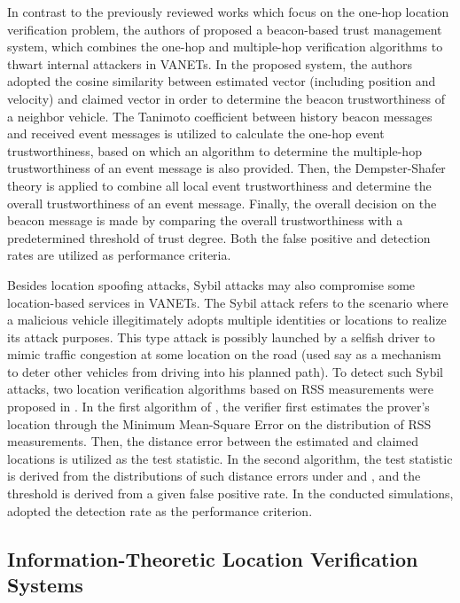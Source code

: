 \documentclass[journal]{IEEEtran}
\begin{document}
 In contrast to the previously reviewed works which focus on the one-hop location verification problem, the authors of \cite{chen2013beacon} proposed a beacon-based trust management system, which combines the one-hop and multiple-hop verification algorithms to thwart internal attackers in VANETs. In the proposed system, the authors adopted the cosine similarity \cite{yan2008providing} between estimated vector (including position and velocity) and claimed vector in order to determine the beacon trustworthiness of a neighbor vehicle. The Tanimoto  coefficient between history beacon messages and received event messages is utilized to calculate the one-hop event trustworthiness, based on which an algorithm to determine the multiple-hop trustworthiness of an event message is also provided. Then, the Dempster-Shafer theory \cite{chen2005dempster} is applied to combine all local event trustworthiness and determine the overall trustworthiness of an event message. Finally, the overall decision on the beacon message is made by comparing the overall trustworthiness with a predetermined threshold of trust degree. Both the false positive and detection rates are utilized as performance criteria.

Besides location spoofing attacks, Sybil attacks may also compromise some location-based services in VANETs. The Sybil attack refers to the scenario where a malicious vehicle illegitimately adopts multiple identities or locations to realize its attack purposes. This type attack is possibly launched by a selfish driver to mimic traffic congestion at some location on the road (used say as a mechanism to deter other vehicles from driving into his planned path). To detect such Sybil attacks, two location verification algorithms based on RSS measurements were proposed in \cite{yu2013detecting}. In the first algorithm of \cite{yu2013detecting}, the verifier first estimates the prover's location through the Minimum Mean-Square Error on the distribution of RSS measurements. Then, the distance error between the estimated and claimed locations is utilized as the test statistic. In the second  algorithm, the test statistic is derived from the distributions of such distance errors under  and , and the threshold is derived from a given false positive rate. In the conducted simulations, \cite{yu2013detecting} adopted the detection rate as the performance criterion.






\subsection{Information-Theoretic Location Verification Systems}
\end{document}
